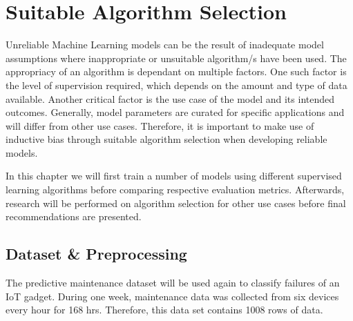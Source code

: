 
\chapter{Suitable Algorithm Selection}
\label{chap:chap4}
Unreliable Machine Learning models can be the result of inadequate model assumptions where inappropriate or unsuitable algorithm/s have been used.
The appropriacy of an algorithm is dependant on multiple factors. 
One such factor is the level of supervision required, which depends on the amount and type of data available.
Another critical factor is the use case of the model and its intended outcomes. Generally, model parameters are curated for specific applications and will differ from other use cases.
Therefore, it is important to make use of inductive bias\cite{saria2019tutorial} through suitable algorithm selection when developing reliable models.

In this chapter we will first train a number of models using different supervised learning algorithms before comparing respective evaluation metrics. 
Afterwards, research will be performed on algorithm selection for other use cases before final recommendations are presented.

\section{Dataset \& Preprocessing}
The predictive maintenance dataset will be used again to classify failures of an IoT gadget.
During one week, maintenance data was collected from six devices every hour for 168 hrs.
Therefore, this data set contains 1008 rows of data. 



